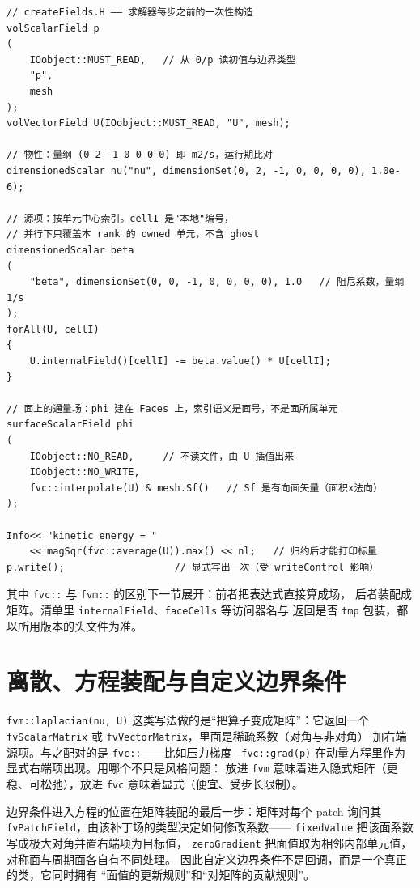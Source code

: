 \documentclass[12pt,a4paper,fontset=fandol]{ctexbook}
\newcommand{\Tp}[1]{\texttt{#1}}
\newcommand{\Bk}{\discretionary{}{}{}}
\begin{document}
\begin{lstlisting}[style=cppstyle, caption={构造场、算源项、写回：注释里点明索引语义},
label={lst:ch06-field-code}]
// createFields.H —— 求解器每步之前的一次性构造
volScalarField p
(
    IOobject::MUST_READ,   // 从 0/p 读初值与边界类型
    "p",
    mesh
);
volVectorField U(IOobject::MUST_READ, "U", mesh);

// 物性：量纲 (0 2 -1 0 0 0 0) 即 m2/s，运行期比对
dimensionedScalar nu("nu", dimensionSet(0, 2, -1, 0, 0, 0, 0), 1.0e-6);

// 源项：按单元中心索引。cellI 是"本地"编号，
// 并行下只覆盖本 rank 的 owned 单元，不含 ghost
dimensionedScalar beta
(
    "beta", dimensionSet(0, 0, -1, 0, 0, 0, 0), 1.0   // 阻尼系数，量纲 1/s
);
forAll(U, cellI)
{
    U.internalField()[cellI] -= beta.value() * U[cellI];
}

// 面上的通量场：phi 建在 Faces 上，索引语义是面号，不是面所属单元
surfaceScalarField phi
(
    IOobject::NO_READ,     // 不读文件，由 U 插值出来
    IOobject::NO_WRITE,
    fvc::interpolate(U) & mesh.Sf()   // Sf 是有向面矢量（面积x法向）
);

Info<< "kinetic energy = "
    << magSqr(fvc::average(U)).max() << nl;   // 归约后才能打印标量
p.write();                   // 显式写出一次（受 writeControl 影响）
\end{lstlisting}

其中 \Tp{fvc::} 与 \Tp{fvm::} 的区别下一节展开：前者把表达式直接算成场，
后者装配成矩阵。清单里 \Tp{internalField}、\Tp{faceCells} 等访问器名与
返回是否 \Tp{tmp} 包装，都以所用版本的头文件为准。

\section{离散、方程装配与自定义边界条件}
\label{sec:ch06-equation}

\Tp{fvm::laplacian(nu, U)} 这类写法做的是``把算子变成矩阵''：它返回一个
\Tp{fv{\Bk}Scalar{\Bk}Matrix} 或 \Tp{fv{\Bk}Vector{\Bk}Matrix}，里面是稀疏系数（对角与非对角）
加右端源项。与之配对的是 \Tp{fvc::}——比如压力梯度 \Tp{-fvc::grad(p)}
在动量方程里作为显式右端项出现。用哪个不只是风格问题：
放进 \Tp{fvm} 意味着进入隐式矩阵（更稳、可松弛），放进 \Tp{fvc}
意味着显式（便宜、受步长限制）。

边界条件进入方程的位置在矩阵装配的最后一步：矩阵对每个 patch 询问其
\Tp{fvPatchField}，由该补丁场的类型决定如何修改系数——
\Tp{fixedValue} 把该面系数写成极大对角并置右端项为目标值，
\Tp{zeroGradient} 把面值取为相邻内部单元值，对称面与周期面各自有不同处理。
因此自定义边界条件不是回调，而是一个真正的类，它同时拥有
``面值的更新规则''和``对矩阵的贡献规则''。
\end{document}
